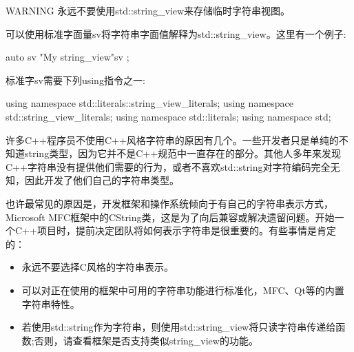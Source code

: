 \begin{myWarning}{WARNING}
永远不要使用std::string\_view来存储临时字符串视图。
\end{myWarning}


可以使用标准字面量sv将字符串字面值解释为std::string\_view。这里有一个例子:

\begin{cpp}
auto sv { "My string_view"sv };
\end{cpp}

标准字sv需要下列using指令之一:

\begin{cpp}
using namespace std::literals::string_view_literals;
using namespace std::string_view_literals;
using namespace std::literals;
using namespace std;
\end{cpp}


许多C++程序员不使用C++风格字符串的原因有几个。一些开发者只是单纯的不知道string类型，因为它并不是C++规范中一直存在的部分。其他人多年来发现C++字符串没有提供他们需要的行为，或者不喜欢std::string对字符编码完全无知，因此开发了他们自己的字符串类型。

也许最常见的原因是，开发框架和操作系统倾向于有自己的字符串表示方式，Microsoft MFC框架中的CString类，这是为了向后兼容或解决遗留问题。开始一个C++项目时，提前决定团队将如何表示字符串是很重要的。有些事情是肯定的：

\begin{itemize}
\item
永远不要选择C风格的字符串表示。

\item
可以对正在使用的框架中可用的字符串功能进行标准化，MFC、Qt等的内置字符串特性。

\item
若使用std::string作为字符串，则使用std::string\_view将只读字符串传递给函数;否则，请查看框架是否支持类似string\_view的功能。
\end{itemize}




























